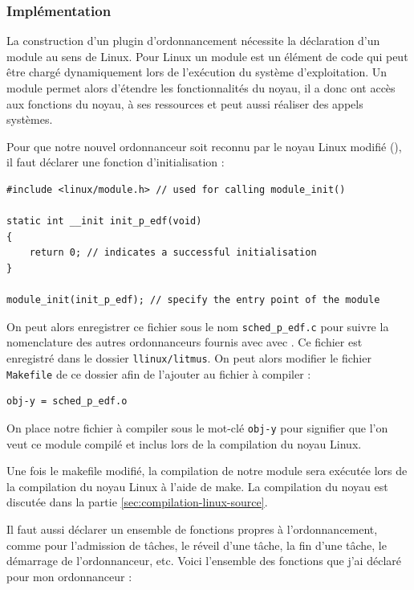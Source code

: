 \subsubsection{Implémentation}

La construction d'un plugin d'ordonnancement nécessite la déclaration d'un module au sens de Linux. Pour Linux un module est un élément de code qui peut être chargé dynamiquement lors de l'exécution du système d'exploitation. Un module permet alors d'étendre les fonctionnalités du noyau, il a donc ont accès aux fonctions du noyau, à ses ressources et peut aussi réaliser des appels systèmes.

Pour que notre nouvel ordonnanceur soit reconnu par le noyau Linux modifié (\litmus), il faut déclarer une fonction d'initialisation :
\begin{lstlisting}[style=cstyle]
#include <linux/module.h> // used for calling module_init()

static int __init init_p_edf(void)
{
    return 0; // indicates a successful initialisation
}

module_init(init_p_edf); // specify the entry point of the module 
\end{lstlisting} 

On peut alors enregistrer ce fichier sous le nom \lstinline{sched_p_edf.c} pour suivre la nomenclature des autres ordonnanceurs fournis avec avec \litmus. Ce fichier est enregistré dans le dossier \lstinline{llinux/litmus}. On peut alors modifier le fichier \lstinline{Makefile} de ce dossier afin de l'ajouter au fichier à compiler :

\begin{lstlisting}[style=makefilestyle]  
    obj-y = sched_p_edf.o
\end{lstlisting}    

On place notre fichier à compiler sous le mot-clé \texttt{obj-y} pour signifier que l'on veut ce module compilé et inclus lors de la compilation du noyau Linux.

Une fois le makefile modifié, la compilation de notre module sera exécutée lors de la compilation du noyau Linux à l'aide de make. La compilation du noyau est discutée dans la partie \ref{sec:compilation-linux-source}.

Il faut aussi déclarer un ensemble de fonctions propres à l'ordonnancement, comme pour l'admission de tâches, le réveil d'une tâche, la fin d'une tâche, le démarrage de l'ordonnanceur, etc. Voici l'ensemble des fonctions que j'ai déclaré pour mon ordonnanceur :

